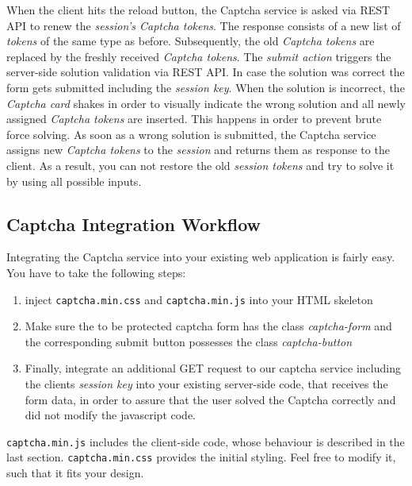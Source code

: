  When the client hits the reload button, the Captcha service is asked via REST API to renew the \textit{session's Captcha tokens}. The response consists of a new list of \textit{tokens} of the same type as before. Subsequently, the old \textit{Captcha tokens} are replaced by the freshly received \textit{Captcha tokens}. The \textit{submit action} triggers the server-side solution validation via REST API. In case the solution was correct the form gets submitted including the \textit{session key}. When the solution is incorrect, the \textit{Captcha card} shakes in order to visually indicate the wrong solution and all newly assigned \textit{Captcha tokens} are inserted. This happens in order to prevent brute force solving. As soon as a wrong solution is submitted, the Captcha service assigns new \textit{Captcha tokens} to the \textit{session} and returns them as response to the client. As a result, you can not restore the old \textit{session tokens} and try to solve it by using all possible inputs.

\subsection{Captcha Integration Workflow}
\label{subsec:Captcha Integration Workflow}

Integrating the Captcha service into your existing web application is fairly easy. You have to take the following steps:
\begin{enumerate}
	\item inject \texttt{captcha.min.css} and \texttt{captcha.min.js} into your HTML skeleton
	\item  Make sure the to be protected captcha form has the class \textit{captcha-form} and the corresponding submit button possesses the class \textit{captcha-button}
	\item Finally, integrate an additional GET request to our captcha service including the clients \textit{session key} into your existing server-side code, that receives the form data, in order to assure that the user solved the Captcha correctly and did not modify the javascript code.
\end{enumerate}

\texttt{captcha.min.js} includes the client-side code, whose behaviour is described in the last section. \texttt{captcha.min.css} provides the initial styling. Feel free to modify it, such that it fits your design. 

\clearpage
